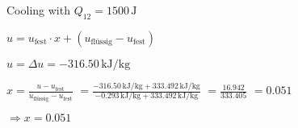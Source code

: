 Cooling with \( Q_{12} = 1500 \, \text{J} \)  

\( u = u_{\text{fest}} \cdot x + (u_{\text{flüssig}} - u_{\text{fest}}) \)  

\( u = \Delta u = -316.50 \, \text{kJ/kg} \)  

\( x = \frac{u - u_{\text{fest}}}{u_{\text{flüssig}} - u_{\text{fest}}} \)  
\( = \frac{-316.50 \, \text{kJ/kg} + 333.492 \, \text{kJ/kg}}{-0.293 \, \text{kJ/kg} + 333.492 \, \text{kJ/kg}} \)  
\( = \frac{16.942}{333.405} \)  
\( = 0.051 \)  

\( \Rightarrow x = 0.051 \)